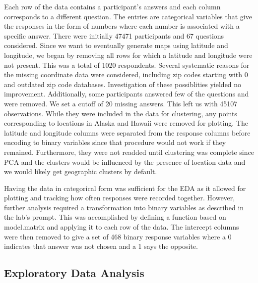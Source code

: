 \documentclass[english]{article}\usepackage{graphicx, color}
\numberwithin{equation}{section}
\numberwithin{figure}{section}
\begin{document}
Each row of the data contains a participant's answers and each column corresponds to a different question. The entries are categorical variables that give the responses in the form of numbers where each number is associated with a specific answer. There were initially 47471 participants and 67 questions considered. Since we want to eventually generate maps using latitude and longitude, we began by removing all rows for which a latitude and longitude were not present. This was a total of 1020 respondents. Several systematic reasons for the missing coordinate data were considered, including zip codes starting with 0 and outdated zip code databases. Investigation of these possiblities yielded no improvement. Additionally, some participants answered few of the questions and were removed. We set a cutoff of 20 missing answers. This left us with 45107 observations. While they were included in the data for clustering, any points corresponding to locations in Alaska and Hawaii were removed for plotting. The latitude and longitude columns were separated from the response columns before encoding to binary variables since that procedure would not work if they remained. Furthermore, they were not readded until clustering was complete since PCA and the clusters would be influenced by the presence of location data and we would likely get geographic clusters by default.

Having the data in categorical form was sufficient for the EDA as it allowed for plotting and tracking how often responses were recorded together. However, further analysis required a transformation into binary variables as described in the lab's prompt. This was accomplished by defining a function based on model.matrix and applying it to each row of the data. The intercept columns were then removed to give a set of 468 binary response variables where a 0 indicates that answer was not chosen and a 1 says the opposite. 

\subsection{Exploratory Data Analysis}
\end{document}
